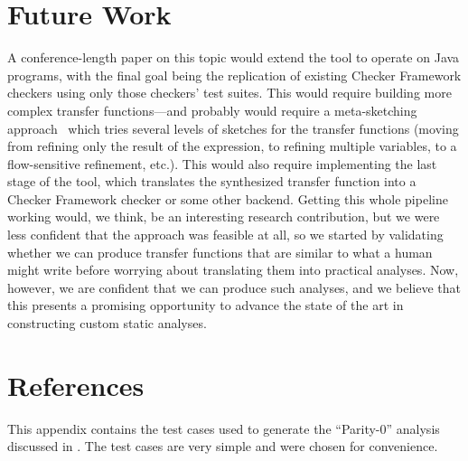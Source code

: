 \documentclass[10pt,conference]{IEEEtran}
\begin{document}
\section{Future Work}
\label{sec-fw}

A conference-length paper on this topic would extend the tool to operate
on Java programs, with the final goal being the replication of
existing Checker Framework checkers using only those checkers'
test suites. This would require building more
complex transfer functions---and probably would require
a meta-sketching approach~\cite{metasketching} which tries several levels of
sketches for the transfer functions (moving from refining only the result of the expression, to
refining multiple variables, to a flow-sensitive refinement, etc.).
This would also require implementing the last stage of the tool, which
translates the synthesized transfer function into a Checker Framework
checker or some other backend. Getting this whole pipeline working would,
we think, be an interesting research contribution, but we were less
confident that the approach was feasible at all, so we started
by validating whether we can produce transfer functions that are
similar to what a human might write before worrying about translating
them into practical analyses.
Now, however, we are confident that we can produce such analyses, and
we believe that this presents a promising opportunity to advance
the state of the art in constructing custom static analyses.

\section{References}

\begingroup
\renewcommand{\section}[2]{}%



%
%
\endgroup

\clearpage

\appendix

This appendix contains the test cases used to generate the ``Parity-0''
analysis discussed in . The test cases are very simple and
were chosen for convenience.
\end{document}
